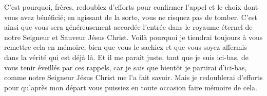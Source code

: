 C’est pourquoi, frères, redoublez d’efforts
		pour confirmer l’appel et le choix dont vous avez bénéficié;
	en agissant de la sorte, vous ne risquez pas de tomber.
C’est ainsi que vous sera généreusement accordée
	l’entrée dans le royaume éternel de notre Seigneur et Sauveur Jésus Christ.
Voilà pourquoi je tiendrai toujours à vous remettre cela en mémoire,
	bien que vous le sachiez
	et que vous soyez affermis dans la vérité qui est déjà là.
Et il me paraît juste, tant que je suis ici-bas,
	de vous tenir éveillés par ces rappels,
	car je sais que bientôt je partirai d’ici-bas,
	comme notre Seigneur Jésus Christ me l’a fait savoir.
Mais je redoublerai d’efforts pour qu’après mon départ
	vous puissiez en toute occasion faire mémoire de cela.
